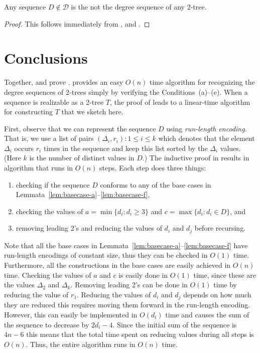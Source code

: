 \documentclass[lotsofwhite,charterfonts]{patmorin}
\begin{document}
\begin{lem}
Any sequence $D\not\in \mathcal{D}$ is the not the degree sequence of
any 2-tree.
\end{lem}

\begin{proof}
This follows immediately from ,  and
.
\end{proof}

\section{Conclusions}

Together,  and  prove .
 provides an easy $O(n)$ time algorithm for recognizing
the degree sequences of 2-trees simply by verifying the
Conditions~(a)--(e).  When a sequence is realizable as a 2-tree $T$,
the proof of  leads to a linear-time algorithm for
constructing $T$ that we sketch here.

First, observe that we can represent the sequence $D$ using
\emph{run-length encoding}.  That is, we use a list of pairs
$(\Delta_i,r_i):1\le i\le k$ which denotes that the element $\Delta_i$
occurs $r_i$ times in the sequence and keep this list sorted by the
$\Delta_i$ values. (Here $k$ is the number of distinct values in $D$.)
The inductive proof in  results in algorithm that runs in
$O(n)$ steps.  Each step does three things:
\begin{enumerate}
\item checking if the sequence $D$ conforms to any of the base cases
in Lemmata~\ref{lem:basecase-a}--\ref{lem:basecase-f},
\item checking the values of $a=\min\{d_i: d_i\ge 3\}$ and
$c=\max\{d_i:d_i\in D\}$, and 
\item removing leading 2's and reducing the values of 
$d_i$ and $d_j$ before recursing.
\end{enumerate}

Note that all the base cases in
Lemmata~\ref{lem:basecase-a}--\ref{lem:basecase-f} have run-length
encodings of constant size, thus they can be checked in $O(1)$ time.
Furthermore, all the constructions in the base cases are easily
achieved in $O(n)$ time.  Checking the values of $a$ and $c$ is easily
done in $O(1)$ time, since these are the values $\Delta_2$ and
$\Delta_k$.  Removing leading 2's can be done in $O(1)$ time by
reducing the value of $r_1$.  Reducing the values of $d_i$ and $d_j$
depends on how much they are reduced this requires moving them forward
in the run-length encoding.  However, this can easily be implemented
in $O(d_i)$ time and causes the sum of the sequence to decrease by
$2d_i-4$.  Since the initial sum of the sequence is $4n-6$ this means
that the total time spent on reducing values during all steps is
$O(n)$.  Thus, the entire algorithm runs in $O(n)$ time.
\end{document}
